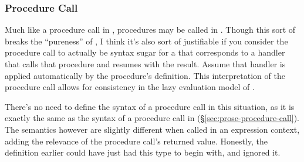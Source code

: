 \subsubsection{Procedure Call}

Much like a procedure call in \Prose{}, procedures may be called in \Poetry{}.
Though this sort of breaks the ``pureness'' of \Poetry{}, I think it's also
sort of justifiable if you consider the procedure call to actually be syntax
sugar for a  that corresponds to a handler that calls that procedure
and resumes with the result. Assume that handler is applied automatically by
the procedure's definition. This interpretation of the procedure call allows
for consistency in the lazy evaluation model of \Poetry{}.

There's no need to define the syntax of a procedure call in this situation,
as it is exactly the same as the syntax of a procedure call in \Prose{}
(\S\ref{sec:prose-procedure-call}). The semantics however are slightly
different when called in an expression context, adding the relevance of
the procedure call's returned value. Honestly, the definition earlier
could have just had this type to begin with, and ignored it.

\begin{prooftree}
\end{prooftree}
